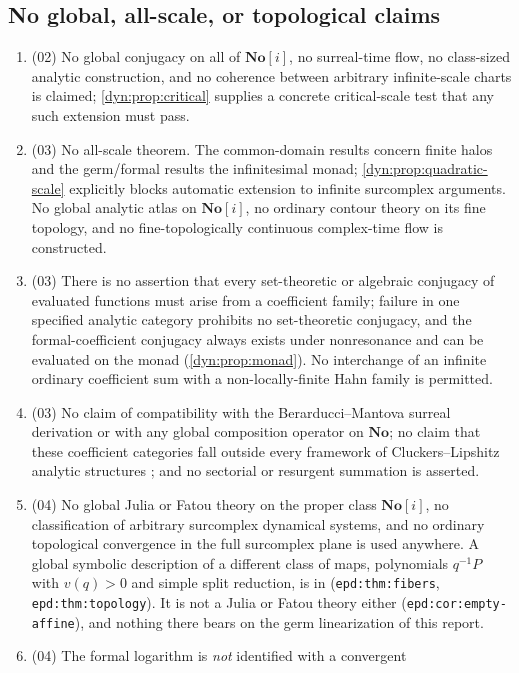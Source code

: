 \documentclass[11pt,letterpaper]{article}
\theoremstyle{definition}
\theoremstyle{remark}
\newcommand{\No}{\mathbf{No}}
\numberwithin{equation}{section}
\begin{document}
\subsection{No global, all-scale, or topological claims}
\begin{enumerate}[label=\textbf{N\arabic*.},leftmargin=3.2em,start=47]
\item (02) No global conjugacy on all of $\No[i]$, no surreal-time flow, no
class-sized analytic construction, and no coherence between arbitrary
infinite-scale charts is claimed; \cref{dyn:prop:critical} supplies a
concrete critical-scale test that any such extension must pass.
\item (03) No all-scale theorem. The common-domain results concern finite
halos and the germ/formal results the infinitesimal monad;
\cref{dyn:prop:quadratic-scale} explicitly blocks automatic extension to
infinite surcomplex arguments. No global analytic atlas on $\No[i]$, no
ordinary contour theory on its fine topology, and no fine-topologically
continuous complex-time flow is constructed.
\item (03) There is no assertion that every set-theoretic or algebraic
conjugacy of evaluated functions must arise from a coefficient family;
failure in one specified analytic category prohibits no set-theoretic
conjugacy, and the formal-coefficient conjugacy always exists under
nonresonance and can be evaluated on the monad
(\cref{dyn:prop:monad}). No interchange of an infinite ordinary coefficient
sum with a non-locally-finite Hahn family is permitted.
\item (03) No claim of compatibility with the Berarducci--Mantova surreal
derivation or with any global composition operator on $\No$; no claim that
these coefficient categories fall outside every framework of
Cluckers--Lipshitz analytic structures \cite{CL}; and no sectorial or
resurgent summation is asserted.
\item (04) No global Julia or Fatou theory on the proper class $\No[i]$, no
classification of arbitrary surcomplex dynamical systems, and no ordinary
topological convergence in the full surcomplex plane is used anywhere.
A global symbolic description of a different class of maps, polynomials
$q^{-1}P$ with $v(q)>0$ and simple split reduction, is in
(\texttt{epd:thm:fibers}, \texttt{epd:thm:topology}). It is not a Julia or
Fatou theory either (\texttt{epd:cor:empty-affine}), and nothing there bears
on the germ linearization of this report.
\item (04) The formal logarithm is \emph{not} identified with a convergent

\end{enumerate}
\end{document}
